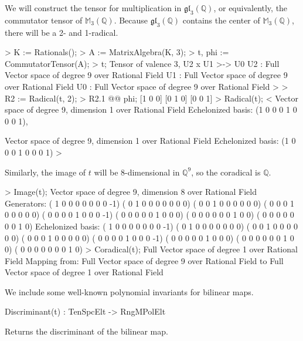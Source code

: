 \begin{example}[Radicals]

We will construct the tensor for multiplication in
$\mathfrak{gl}_3(\mathbb{Q})$, or equivalently, the commutator tensor of
$\mathbb{M}_3(\mathbb{Q})$. Because $\mathfrak{gl}_3(\mathbb{Q})$ contains the
center of $\mathbb{M}_3(\mathbb{Q})$, there will be a 2- and 1-radical.
\begin{code}
> K := Rationals();
> A := MatrixAlgebra(K, 3);
> t, phi := CommutatorTensor(A);
> t;
Tensor of valence 3, U2 x U1 >-> U0
U2 : Full Vector space of degree 9 over Rational Field
U1 : Full Vector space of degree 9 over Rational Field
U0 : Full Vector space of degree 9 over Rational Field
> 
> R2 := Radical(t, 2);
> R2.1 @@ phi;
[1 0 0]
[0 1 0]
[0 0 1]
> Radical(t);
<
    Vector space of degree 9, dimension 1 over Rational Field
    Echelonized basis:
    (1 0 0 0 1 0 0 0 1),

    Vector space of degree 9, dimension 1 over Rational Field
    Echelonized basis:
    (1 0 0 0 1 0 0 0 1)
>
\end{code}

Similarly, the image of $t$ will be 8-dimensional in $\mathbb{Q}^9$, so the coradical is $\mathbb{Q}$.
\begin{code}
> Image(t);
Vector space of degree 9, dimension 8 over Rational Field
Generators:
( 1  0  0  0  0  0  0  0 -1)
( 0  1  0  0  0  0  0  0  0)
( 0  0  1  0  0  0  0  0  0)
( 0  0  0  1  0  0  0  0  0)
( 0  0  0  0  1  0  0  0 -1)
( 0  0  0  0  0  1  0  0  0)
( 0  0  0  0  0  0  1  0  0)
( 0  0  0  0  0  0  0  1  0)
Echelonized basis:
( 1  0  0  0  0  0  0  0 -1)
( 0  1  0  0  0  0  0  0  0)
( 0  0  1  0  0  0  0  0  0)
( 0  0  0  1  0  0  0  0  0)
( 0  0  0  0  1  0  0  0 -1)
( 0  0  0  0  0  1  0  0  0)
( 0  0  0  0  0  0  1  0  0)
( 0  0  0  0  0  0  0  1  0)
> Coradical(t);
Full Vector space of degree 1 over Rational Field
Mapping from: Full Vector space of degree 9 over Rational Field to Full
Vector space of degree 1 over Rational Field
\end{code}
\end{example}


We include some well-known polynomial invariants for bilinear maps.
\begin{intrinsics}
Discriminant(t) : TenSpcElt -> RngMPolElt
\end{intrinsics}

Returns the discriminant of the bilinear map.

